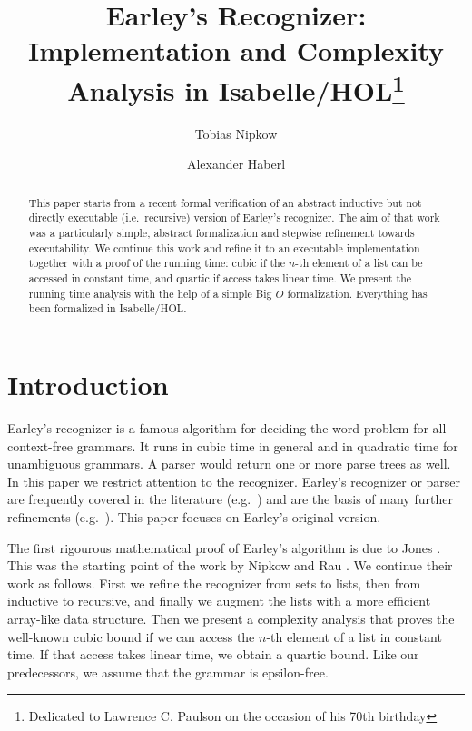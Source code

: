 \documentclass[runningheads]{llncs}
\begin{document}
\title{Earley's Recognizer: Implementation and Complexity Analysis in Isabelle/HOL\thanks{Dedicated to Lawrence C. Paulson on the occasion of his 70th birthday}}

\author{Tobias Nipkow \and
Alexander Haberl}
%


\maketitle

\begin{abstract}
This paper starts from a recent formal verification
of an abstract inductive but not directly executable (i.e.\ recursive) version of Earley's recognizer.
The aim of that work was a particularly simple, abstract formalization and stepwise refinement
towards executability. We continue this work and refine it to an executable
implementation together with a proof of the running time: cubic if the $n$-th element of
a list can be accessed in constant time, and quartic if access takes linear time.
We present the running time analysis with the help of a simple Big $O$ formalization.
Everything has been formalized in Isabelle/HOL.
\end{abstract}

\section{Introduction}

Earley's recognizer \cite{Earley-PhD,Earley-CACM} is a famous algorithm for deciding the word problem
for all context-free grammars. It runs in cubic time in general and in quadratic time for unambiguous grammars.
A parser would return one or more parse trees as well.
In this paper we restrict attention to the recognizer.
Earley's recognizer or parser are frequently covered in the literature (e.g.\ \cite{AhoU72})
and are the basis of many further refinements (e.g.\ \cite{Scott-ENTCS08}).
This paper focuses on Earley's original version.

The first rigourous mathematical proof of Earley's algorithm is due to Jones \cite{Jones,Jones:tr}.
This was the starting point of the work by Nipkow and Rau \cite{NipkowR-CBJ24}.
We continue their work as follows.
First we refine the recognizer from sets to lists, then from inductive to recursive, and finally
we augment the lists with a more efficient array-like data structure.
Then we present a complexity analysis that proves the well-known cubic bound
if we can access the $n$-th element of a list in constant time.
If that access takes linear time, we obtain a quartic bound.
Like our predecessors, we assume that the grammar is epsilon-free.
\end{document}
